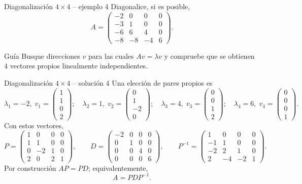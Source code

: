 \documentclass[aspectratio=169,10pt]{beamer}
\begin{document}
\begin{frame}{Diagonalización $4\times 4$ -- ejemplo 4}
\small
Diagonalice, si es posible,
\[
A=\begin{pmatrix}-2 & 0 & 0 & 0\\-3 & 1 & 0 & 0\\-6 & 6 & 4 & 0\\-8 & -8 & -4 & 6\end{pmatrix}.
\]
\begin{block}{Guía}
Busque direcciones $v$ para las cuales $Av=\lambda v$ y compruebe que se obtienen $4$ vectores propios linealmente independientes.
\end{block}
\end{frame}
\begin{frame}{Diagonalización $4\times 4$ -- solución 4}
\scriptsize
Una elección de pares propios es
\[
\lambda_1=-2,\;v_1=\begin{pmatrix}1\\1\\0\\2\end{pmatrix};\quad \lambda_2=1,\;v_2=\begin{pmatrix}0\\1\\-2\\0\end{pmatrix};\quad \lambda_3=4,\;v_3=\begin{pmatrix}0\\0\\1\\2\end{pmatrix};\quad \lambda_4=6,\;v_4=\begin{pmatrix}0\\0\\0\\1\end{pmatrix}.
\]
Con estos vectores,
\[
P=\begin{pmatrix}1 & 0 & 0 & 0\\1 & 1 & 0 & 0\\0 & -2 & 1 & 0\\2 & 0 & 2 & 1\end{pmatrix},\qquad D=\begin{pmatrix}-2 & 0 & 0 & 0\\0 & 1 & 0 & 0\\0 & 0 & 4 & 0\\0 & 0 & 0 & 6\end{pmatrix},\qquad P^{-1}=\begin{pmatrix}1 & 0 & 0 & 0\\-1 & 1 & 0 & 0\\-2 & 2 & 1 & 0\\2 & -4 & -2 & 1\end{pmatrix}.
\]
Por construcción $AP=PD$; equivalentemente,
\[
\boxed{A=PDP^{-1}}.
\]
\end{frame}
\end{document}
